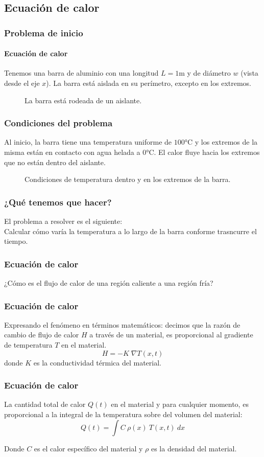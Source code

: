 \subsection{Ecuación de calor}
\begin{frame}
\frametitle{Problema de inicio}
\framesubtitle{Ecuación de calor}
Tenemos una barra de aluminio con una longitud $L = 1 \si\meter$ y de diámetro $w$ (vista desde el eje $x$). La barra está aislada en su perímetro, excepto en los extremos.
\begin{figure}
	\centering
	
	\caption{La barra está rodeada de un aislante.}
\end{figure}
\end{frame}
\begin{frame}
\frametitle{Condiciones del problema}
Al inicio, la barra tiene una temperatura uniforme de $100 \si\celsius$ y los extremos de la misma están en contacto con agua helada a $0 \si\celsius$. El calor fluye hacia los extremos que no están dentro del aislante.
\begin{figure}
	\centering
	
	\caption{Condiciones de temperatura dentro y en los extremos de la barra.}
\end{figure}
\end{frame}
\begin{frame}
\frametitle{¿Qué tenemos que hacer?}
El problema a resolver es el siguiente:
\\
\bigskip
Calcular cómo varía la temperatura a lo largo de la barra conforme trasncurre el tiempo.
\end{frame}
\begin{frame}
\frametitle{Ecuación de calor}
¿Cómo es el flujo de calor de una región caliente a una región fría?
\end{frame}
\begin{frame}
\frametitle{Ecuación de calor}
Expresando el fenómeno en términos matemáticos: decimos que la razón de cambio de flujo de calor $H$ a través de un material, es proporcional al gradiente de temperatura $T$ en el material.
\begin{equation}
H = -K \; \nabla T(x, t)
\label{eq:ecuacion_17_55}	
\end{equation}
donde $K$ es la conductividad térmica del material.
\end{frame}
\begin{frame}
\frametitle{Ecuación de calor}
La cantidad total de calor $Q(t)$ en el material y para cualquier momento, es proporcional a la  integral de la temperatura sobre del volumen del material:
\begin{equation}
Q(t) = \int C \: \rho(x) \: T(x, t) \: dx
\label{eq:ecuacion_17_56}
\end{equation}

Donde $C$ es el calor específico del material y $\rho$ es la densidad del material. 
\end{frame}
